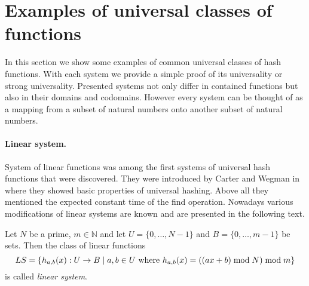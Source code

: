 \section{Examples of universal classes of functions}
In this section we show some examples of common universal classes of hash functions. With each system we provide a simple proof of its universality or strong universality. Presented systems not only differ in contained functions but also in their domains and codomains. However every system can be thought of as a mapping from a subset of natural numbers onto another subset of natural numbers.

\paragraph{Linear system.}
System of linear functions was among the first systems of universal hash functions that were discovered. They were introduced by Carter and Wegman in \cite{DBLP:journals/jcss/CarterW79} where they showed basic properties of universal hashing. Above all they mentioned the expected constant time of the find operation. Nowadays various modifications of linear systems are known and are presented in the following text. 

\begin{definition}
\label{definition-linear-system}
Let $N$ be a prime, $m \in \mathbb{N}$ and let $U = \{0, \dots, N - 1 \}$ and $B = \{0, \dots, m - 1\}$ be sets. Then the class of linear functions 
\[ LS = \{h_{a, b}(x): U \rightarrow B \mid a, b \in U \text{ where } h_{a, b}(x) = ((ax + b) \bmod N) \bmod m \} \]
is called \emph{linear system}.
\end{definition}

